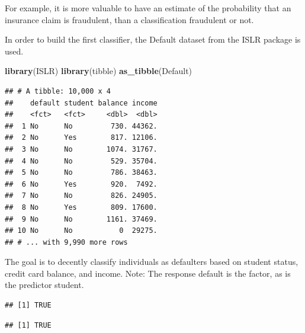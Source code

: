 \documentclass[]{report}
\newenvironment{Shaded}{\begin{snugshade}}{\end{snugshade}}
\newcommand{\KeywordTok}[1]{\textcolor[rgb]{0.13,0.29,0.53}{\textbf{#1}}}
\newcommand{\OperatorTok}[1]{\textcolor[rgb]{0.81,0.36,0.00}{\textbf{#1}}}
\newcommand{\NormalTok}[1]{#1}
\begin{document}
For example, it is more valuable to have an estimate of the probability
that an insurance claim is fraudulent, than a classification fraudulent
or not.

In order to build the first classifier, the Default dataset from the
ISLR package is used.

\begin{Shaded}
\begin{Highlighting}[]
\KeywordTok{library}\NormalTok{(ISLR)}
\KeywordTok{library}\NormalTok{(tibble)}
\KeywordTok{as_tibble}\NormalTok{(Default)}
\end{Highlighting}
\end{Shaded}

\begin{verbatim}
## # A tibble: 10,000 x 4
##    default student balance income
##    <fct>   <fct>     <dbl>  <dbl>
##  1 No      No         730. 44362.
##  2 No      Yes        817. 12106.
##  3 No      No        1074. 31767.
##  4 No      No         529. 35704.
##  5 No      No         786. 38463.
##  6 No      Yes        920.  7492.
##  7 No      No         826. 24905.
##  8 No      Yes        809. 17600.
##  9 No      No        1161. 37469.
## 10 No      No           0  29275.
## # ... with 9,990 more rows
\end{verbatim}

The goal is to decently classify individuals as defaulters based on
student status, credit card balance, and income. Note: The response
default is the factor, as is the predictor student.

\begin{Shaded}
\end{Shaded}

\begin{verbatim}
## [1] TRUE
\end{verbatim}

\begin{Shaded}
\end{Shaded}

\begin{verbatim}
## [1] TRUE
\end{verbatim}
\end{document}
